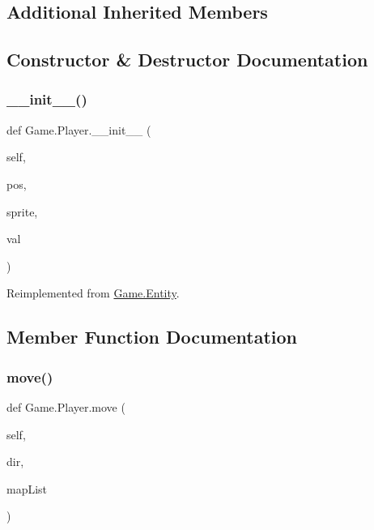 \subsection*{Additional Inherited Members}


\subsection{Constructor \& Destructor Documentation}
\mbox{\label{class_game_1_1_player_af39ee9cc682269f7f1c1494b8855a1cb}} 
\subsubsection{\texorpdfstring{\_\_init\_\_()}{\_\_init\_\_()}}
{\footnotesize\ttfamily def Game.\+Player.\+\_\+\+\_\+init\+\_\+\+\_\+ (\begin{DoxyParamCaption}\item[{}]{self,  }\item[{}]{pos,  }\item[{}]{sprite,  }\item[{}]{val }\end{DoxyParamCaption})}



Reimplemented from \mbox{\hyperlink{class_game_1_1_entity_a1cbc73a05ee02271fa7dca66f3a83ecf}{Game.\+Entity}}.



\subsection{Member Function Documentation}
\mbox{\label{class_game_1_1_player_af495ce554741a4feb640d981aaea79b7}} 
\subsubsection{\texorpdfstring{move()}{move()}}
{\footnotesize\ttfamily def Game.\+Player.\+move (\begin{DoxyParamCaption}\item[{}]{self,  }\item[{}]{dir,  }\item[{}]{map\+List }\end{DoxyParamCaption})}



